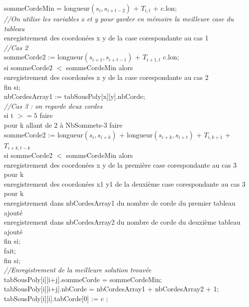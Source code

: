 \documentclass[a4paper,10pt]{article}
\begin{document}
\begin{tabbing}
	\> \> sommeCordeMin = longueur$(s_i, s_{i+t-2})$ + $T_{i,t}$ + c.lon; \\
	\> \> \textit{//On utilise les variables x et y pour garder en mémoire la meilleure case du tableau }\\ 
	\> \> enregistrement des coordonées x y de la case corespondante au cas 1 \\
	\> \> \textit{//Cas 2} \\
	\> \> sommeCorde2 := longueur$(s_{i+1}, s_{i+t-1})$ + $T_{i+1,t}$  c.lon; \\	\> \> si sommeCorde2 $<$ sommeCordeMin alors \\
	  \> \> \> enregistrement des coordonées x y de la case corespondante au cas 2 \\
	\> \> fin si; \\
	\> \> nbCordesArray1 := tabSousPoly[x][y].nbCorde; \\
	\> \> \textit{//Cas 3 : on regarde deux cordes} \\
	\> \> si t $>= 5$ faire \\
	  \> \> \> pour k allant de 2 à NbSommets-3 faire \\
	    \> \> \> \> sommeCorde2 := longueur$(s_i, s_{i+k})$ + longueur$(s_{i+k}, s_{i+t})$ + $T_{i,k+1}$ + $T_{i+k,t-k}$ \\
	    \> \> \> \> si sommeCorde2 $<$ sommeCordeMin alors \\
	      \> \> \> \> \>  enregistrement des coordonées x y de la première case corespondante au cas 3 pour k \\
	      \> \> \> \> \>  enregistrement des coordonées x1 y1 de la deuxième case corespondante au cas 3 pour k \\
	      \> \> \> \> \> enregistrement dans nbCordesArray1 du nombre de corde du premier tableau ajouté \\
	      \> \> \> \> \> enregistrement dans nbCordesArray2 du nombre de corde du deuxième tableau ajouté \\	      
	    \> \> \> \> fin si; \\
	  \> \> \> fait; \\
	\> \> fin si; \\
	\> \> \textit{//Enregistrement de la meilleure solution trouvée }\\
	\> \> tabSousPoly[i][i+j].sommeCorde = sommeCordeMin; \\
	\> \> tabSousPoly[i][i+j].nbCorde = nbCordesArray1 + nbCordesArray2 + 1; \\
	\> \> tabSousPoly[i][i].tabCorde[0] := c ; \\

\end{tabbing}
\end{document}
